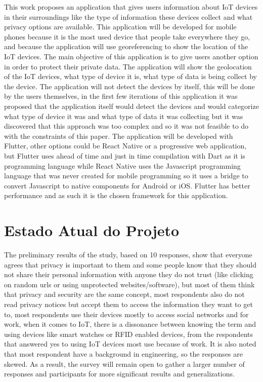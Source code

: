 \documentclass[conference]{IEEEtran}
\begin{document}
This work proposes an application that gives users information about IoT
devices in their surroundings like the type of information these devices
collect and what privacy options are available. This application will be
developed for mobile phones because it is the most used device that people
take everywhere they go, and because the application will use georeferencing
to show the location of the IoT devices. The main objective of this application
is to give users another option in order to protect their private data.
The application will show the geolocation of the IoT devices, what type
of device it is, what type of data is being collect by the device. The application
will not detect the devices by itself, this will be done by the users themselves,
in the first few iterations of this application it was proposed that the
application itself would detect the devices and would categorize what type
of device it was and what type of data it was collecting but it was discovered
that this approach was too complex and so it was not feasible to do with
the constraints of this paper. The application will be developed with Flutter,
other options could be React Native or a progressive web application, but
Flutter uses ahead of time and just in time compilation with Dart as it
is programming language while React Native uses the Javascript programming
language that was never created for mobile programming so it uses a bridge
to convert Javascript to native components for Android or iOS. Flutter has
better performance and as such it is the chosen framework for this application.

\section{Estado Atual do Projeto}

The preliminary results of the study, based on 10 responses, show that everyone
agrees that privacy is important to them and some people know that they
should not share their personal information with anyone they do not trust
(like clicking on random urls or using unprotected websites/software), but
most of them think that privacy and security are the same concept, most
respondents also do not read privacy notices but accept them to access the
information they want to get to, most respondents use their devices mostly
to access social networks and for work, when it comes to IoT, there is a
dissonance between knowing the term and using devices like smart watches
or RFID enabled devices, from the respondents that answered yes to using
IoT devices most use because of work. It is also noted that most respondent
have a background in engineering, so the responses are skewed. As a result,
the survey will remain open to gather a larger number of responses and participants
for more significant results and generalizations.
\end{document}
